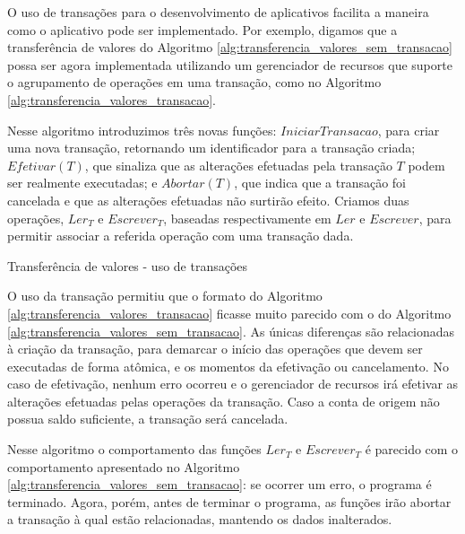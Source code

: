 \documentclass[11pt,twoside,a4paper]{book}
\begin{document}
O uso de transações para o desenvolvimento de aplicativos facilita a maneira como o aplicativo pode ser implementado. Por exemplo, digamos que a 
transferência de valores do Algoritmo \ref{alg:transferencia_valores_sem_transacao} possa ser agora implementada utilizando um gerenciador de 
recursos que suporte o agrupamento de operações em uma transação, como no Algoritmo \ref{alg:transferencia_valores_transacao}. 

Nesse algoritmo introduzimos três novas funções: $IniciarTransacao$, para criar uma nova transação, retornando um identificador para a transação 
criada; $Efetivar(T)$, que sinaliza que as alterações efetuadas pela transação $T$ podem ser realmente executadas; e $Abortar(T)$, que indica que 
a transação foi cancelada e que as alterações efetuadas não surtirão
efeito. Criamos duas operações, $Ler_T$ e $Escrever_T$, baseadas respectivamente
em $Ler$ e $Escrever$, para permitir associar a referida operação com
uma transação dada.

\begin{algorithm}
\caption{Transferência de valores - uso de transações}
\label{alg:transferencia_valores_transacao}
\end{algorithm}

O uso da transação permitiu que o formato do Algoritmo
\ref{alg:transferencia_valores_transacao} ficasse muito parecido com o do Algoritmo \ref{alg:transferencia_valores_sem_transacao}. As únicas 
diferenças são relacionadas à criação da transação, para demarcar o início das operações que devem ser executadas de forma atômica, e os momentos 
da efetivação ou cancelamento. No caso de efetivação, nenhum erro ocorreu e o gerenciador de recursos irá efetivar as alterações efetuadas pelas operações da transação. Caso a conta de origem não possua saldo suficiente, a transação será cancelada.

Nesse algoritmo o comportamento das funções $Ler_T$ e $Escrever_T$ é parecido
com o comportamento apresentado no Algoritmo \ref{alg:transferencia_valores_sem_transacao}: se ocorrer um erro, o programa é terminado. Agora, 
porém, antes de terminar o programa, as funções irão abortar a transação à qual estão relacionadas, mantendo os dados inalterados.
\end{document}

